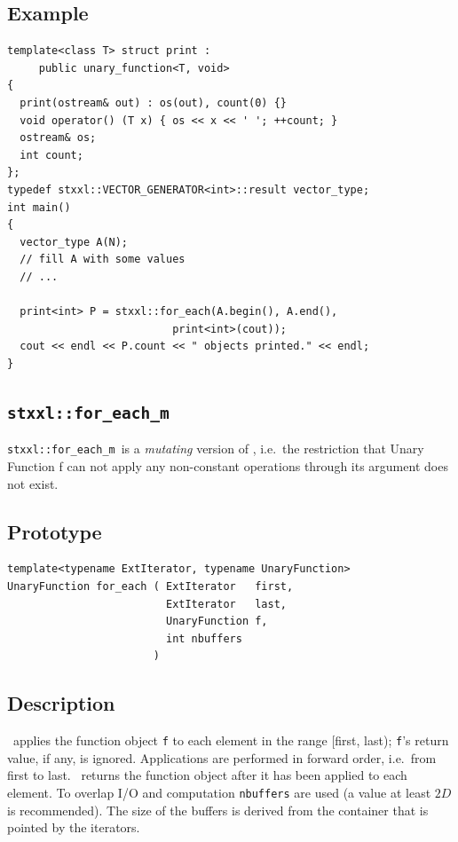 \documentclass[twoside]{book}
\begin{document}
\subsection*{Example}
\begin{lstlisting}
template<class T> struct print : 
     public unary_function<T, void>
{
  print(ostream& out) : os(out), count(0) {}
  void operator() (T x) { os << x << ' '; ++count; }
  ostream& os;
  int count;
};
typedef stxxl::VECTOR_GENERATOR<int>::result vector_type;
int main()
{
  vector_type A(N);
  // fill A with some values
  // ...  

  print<int> P = stxxl::for_each(A.begin(), A.end(), 
                          print<int>(cout));
  cout << endl << P.count << " objects printed." << endl;
}
\end{lstlisting}

\newcommand{\xforeachm}{{\texttt{stxxl::for\_each\_m}}}
\subsection{\xforeachm}
\xforeachm\ is a \emph{mutating} version of \xforeach, i.e.\ 
the restriction that Unary Function f can not apply any non-constant
operations through its argument does not exist.

\subsection*{Prototype}
\begin{lstlisting}
template<typename ExtIterator, typename UnaryFunction>
UnaryFunction for_each ( ExtIterator   first,
                         ExtIterator   last,
                         UnaryFunction f,
                         int nbuffers
                       )        
\end{lstlisting}
\subsection*{Description}
\xforeach\ applies the function object \texttt{f} to each element in the range
[first, last); \texttt{f}'s return value, if any, is
ignored. Applications are 
performed in forward order, i.e.\ from first to last. \xforeach\ returns
the function object after it has been applied to each element. 
 To
overlap I/O and computation \texttt{nbuffers} are used (a value at
least $2D$ is recommended). The size of
the buffers is derived from the container that is pointed by the
iterators. 
\end{document}
